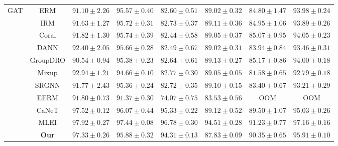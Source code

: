 \documentclass{article}
\begin{document}
\begin{table}[htbp]
\begin{tabular}{c c | c c | c c | c c}
\midrule \midrule %

\multirow{11}{*}{GAT} 
& ERM      & $91.10 \pm 2.26$ & $95.57 \pm 0.40$ & $82.60 \pm 0.51$ & $89.02 \pm 0.32$ & $84.80 \pm 1.47$ & $93.98 \pm 0.24$ \\
& IRM      & $91.63 \pm 1.27$ & $95.72 \pm 0.31$ & $82.73 \pm 0.37$ & $89.11 \pm 0.36$ & $84.95 \pm 1.06$ & $93.89 \pm 0.26$ \\
& Coral    & $91.82 \pm 1.30$ & $95.74 \pm 0.39$ & $82.44 \pm 0.58$ & $89.05 \pm 0.37$ & $85.07 \pm 0.95$ & $94.05 \pm 0.23$ \\
& DANN     & $92.40 \pm 2.05$ & $95.66 \pm 0.28$ & $82.49 \pm 0.67$ & $89.02 \pm 0.31$ & $83.94 \pm 0.84$ & $93.46 \pm 0.31$ \\
& GroupDRO & $90.54 \pm 0.94$ & $95.38 \pm 0.23$ & $82.64 \pm 0.61$ & $89.13 \pm 0.27$ & $85.17 \pm 0.86$ & $94.00 \pm 0.18$ \\
& Mixup    & $92.94 \pm 1.21$ & $94.66 \pm 0.10$ & $82.77 \pm 0.30$ & $89.05 \pm 0.05$ & $81.58 \pm 0.65$ & $92.79 \pm 0.18$ \\
& SRGNN    & $91.77 \pm 2.43$ & $95.36 \pm 0.24$ & $82.72 \pm 0.35$ & $89.10 \pm 0.15$ & $83.40 \pm 0.67$ & $93.21 \pm 0.29$ \\
& EERM     & $91.80 \pm 0.73$ & $91.37 \pm 0.30$ & $74.07 \pm 0.75$ & $83.53 \pm 0.56$ & OOM              & OOM              \\
& CaNeT    & \underline{$97.52 \pm 0.12$} & $96.07 \pm 0.44$ & \underline{$95.33 \pm 0.22$} & $89.12 \pm 0.52$ & $89.50 \pm 1.07$ & $95.03 \pm 0.26$ \\
& MLEI & $\mathbf{97.92 \pm 0.27}$ & $97.44 \pm 0.08$ & $\mathbf{96.78 \pm 0.30}$ & $94.51 \pm 0.28$ & $\mathbf{91.23 \pm 0.77}$ & $97.16 \pm 0.16$ \\ %
\cline{2-8}
& \textbf{Our} & $97.33 \pm 0.26$ & $95.88 \pm0.32$ & $94.31 \pm 0.13$ & $87.83 \pm 0.09$ & $\underline{90.35 \pm 0.65}$ & $95.91 \pm 0.10$ \\ %

\bottomrule
\end{tabular}
\end{table}
\end{document}
